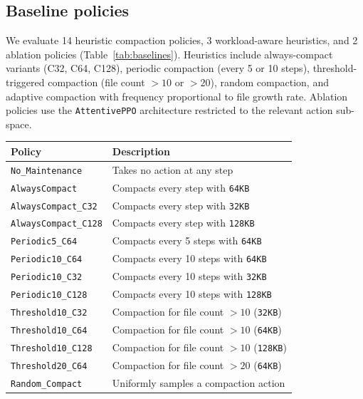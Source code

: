 \documentclass[fleqn,10pt]{wlscirep}
\newcommand{\attentive}{\texttt{AttentivePPO}}
\begin{document}
\FloatBarrier

\subsection*{Baseline policies}

We evaluate 14 heuristic compaction policies, 3 workload-aware
heuristics, and 2 ablation policies (Table~\ref{tab:baselines}).
Heuristics include always-compact variants (C32, C64, C128), periodic
compaction (every 5 or 10 steps), threshold-triggered compaction (file
count $>10$ or $>20$), random compaction, and adaptive compaction with
frequency proportional to file growth rate. Ablation policies use the
\attentive{} architecture restricted to the relevant action sub-space.

\begin{table}[!htbp]
\centering
\renewcommand{\arraystretch}{0.85}
\begin{tabular}{lp{8cm}}
\toprule
\textbf{Policy} & \textbf{Description} \\
\midrule
\texttt{No\_Maintenance}          & Takes no action at any step \\
\texttt{AlwaysCompact}            & Compacts every step with \texttt{64KB} \\
\texttt{AlwaysCompact\_C32}       & Compacts every step with \texttt{32KB} \\
\texttt{AlwaysCompact\_C128}      & Compacts every step with \texttt{128KB} \\
\texttt{Periodic5\_C64}           & Compacts every 5 steps with \texttt{64KB} \\
\texttt{Periodic10\_C64}          & Compacts every 10 steps with \texttt{64KB} \\
\texttt{Periodic10\_C32}          & Compacts every 10 steps with \texttt{32KB} \\
\texttt{Periodic10\_C128}         & Compacts every 10 steps with \texttt{128KB} \\
\texttt{Threshold10\_C32}         & Compaction for file count $> 10$ (\texttt{32KB}) \\
\texttt{Threshold10\_C64}         & Compaction for file count $> 10$ (\texttt{64KB}) \\
\texttt{Threshold10\_C128}        & Compaction for file count $> 10$ (\texttt{128KB}) \\
\texttt{Threshold20\_C64}         & Compaction for file count $> 20$ (\texttt{64KB}) \\
\texttt{Random\_Compact}          & Uniformly samples a compaction action \\

\end{tabular}
\end{table}
\end{document}
